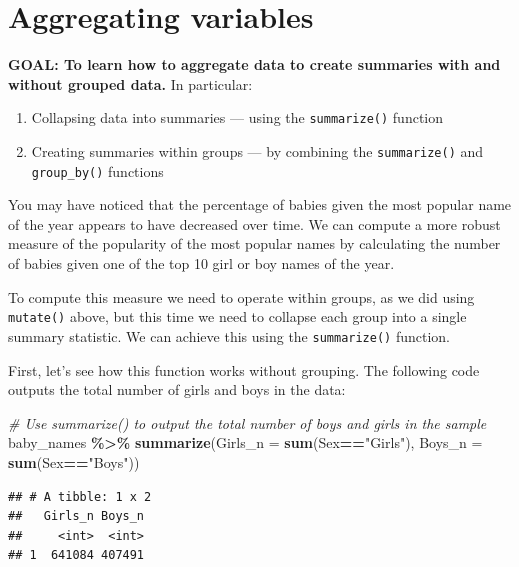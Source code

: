 \documentclass[
]{book}
\newenvironment{Shaded}{\begin{snugshade}}{\end{snugshade}}
\newcommand{\CommentTok}[1]{\textcolor[rgb]{0.56,0.35,0.01}{\textit{#1}}}
\newcommand{\DataTypeTok}[1]{\textcolor[rgb]{0.13,0.29,0.53}{#1}}
\newcommand{\KeywordTok}[1]{\textcolor[rgb]{0.13,0.29,0.53}{\textbf{#1}}}
\newcommand{\NormalTok}[1]{#1}
\newcommand{\OperatorTok}[1]{\textcolor[rgb]{0.81,0.36,0.00}{\textbf{#1}}}
\newcommand{\StringTok}[1]{\textcolor[rgb]{0.31,0.60,0.02}{#1}}
\providecommand{\tightlist}{%
  \setlength{\itemsep}{0pt}\setlength{\parskip}{0pt}}
\begin{document}
\hypertarget{aggregating-variables}{%
\section{Aggregating variables}\label{aggregating-variables}}

\textbf{GOAL: To learn how to aggregate data to create summaries with and without grouped data.} In particular:

\begin{enumerate}
\def\labelenumi{\arabic{enumi}.}
\tightlist
\item
  Collapsing data into summaries --- using the \texttt{summarize()} function
\item
  Creating summaries within groups --- by combining the \texttt{summarize()} and \texttt{group\_by()} functions
\end{enumerate}

You may have noticed that the percentage of babies given the most popular name of the year appears to have decreased over time. We can compute a more robust measure of the popularity of the most popular names by calculating the number of babies given one of the top 10 girl or boy names of the year.

To compute this measure we need to operate within groups, as we did using \texttt{mutate()} above, but this time we need to collapse each group into a single summary statistic. We can achieve this using the \texttt{summarize()} function.

First, let's see how this function works without grouping. The following code outputs the total number of girls and boys in the data:

\begin{Shaded}
\begin{Highlighting}[]
\CommentTok{\# Use summarize() to output the total number of boys and girls in the sample}
\NormalTok{baby\_names }\OperatorTok{\%\textgreater{}\%}\StringTok{ }
\StringTok{  }\KeywordTok{summarize}\NormalTok{(}\DataTypeTok{Girls\_n =} \KeywordTok{sum}\NormalTok{(Sex}\OperatorTok{==}\StringTok{"Girls"}\NormalTok{),}
            \DataTypeTok{Boys\_n =} \KeywordTok{sum}\NormalTok{(Sex}\OperatorTok{==}\StringTok{"Boys"}\NormalTok{))}
\end{Highlighting}
\end{Shaded}

\begin{verbatim}
## # A tibble: 1 x 2
##   Girls_n Boys_n
##     <int>  <int>
## 1  641084 407491
\end{verbatim}
\end{document}
